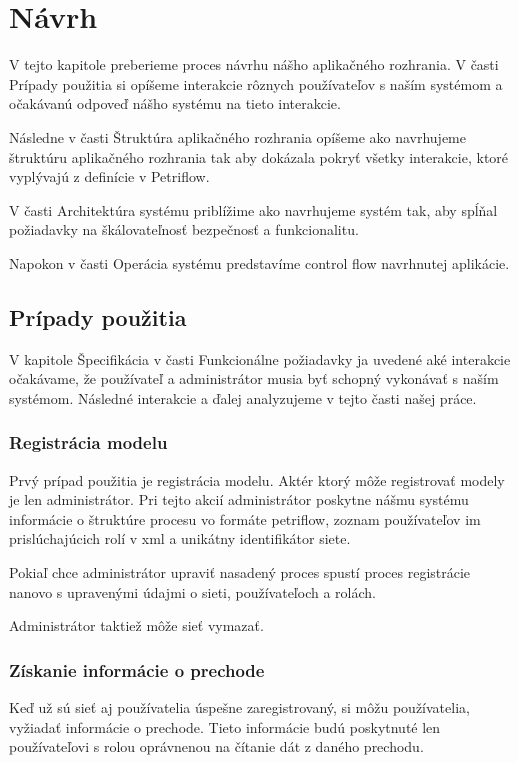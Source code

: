 \section{Návrh}
V tejto kapitole preberieme proces návrhu nášho aplikačného rozhrania. V časti Prípady použitia si opíšeme interakcie rôznych používateľov s naším systémom a očakávanú odpoveď nášho systému na tieto interakcie.

Následne v časti Štruktúra aplikačného rozhrania opíšeme ako navrhujeme štruktúru aplikačného rozhrania tak aby dokázala pokryť všetky interakcie, ktoré vyplývajú z definície v Petriflow. 

V časti Architektúra systému priblížime ako navrhujeme systém tak, aby spĺňal požiadavky na škálovateľnosť bezpečnosť a funkcionalitu.

Napokon v časti Operácia systému predstavíme control flow navrhnutej aplikácie.


\subsection{Prípady použitia} \label{usecases}
V kapitole Špecifikácia v časti Funkcionálne požiadavky ja uvedené aké interakcie očakávame, že používateľ a administrátor musia byť schopný vykonávať s naším systémom. Následné interakcie a ďalej analyzujeme v tejto časti našej práce. 

\subsubsection{Registrácia modelu}
Prvý prípad použitia je registrácia modelu. Aktér ktorý môže registrovať modely je len administrátor. Pri tejto akcií administrátor poskytne nášmu systému informácie o štruktúre procesu vo formáte petriflow, zoznam používateľov im prislúchajúcich rolí v \acrshort{xml} a unikátny identifikátor siete.

Pokiaľ chce administrátor upraviť nasadený proces spustí proces registrácie nanovo s upravenými údajmi o sieti, používateľoch a rolách.

Administrátor taktiež môže sieť vymazať.

\subsubsection{Získanie informácie o prechode}
Keď už sú sieť aj používatelia úspešne zaregistrovaný, si môžu používatelia, vyžiadať informácie o prechode. Tieto informácie budú poskytnuté len používateľovi s rolou oprávnenou na čítanie dát z daného prechodu.

